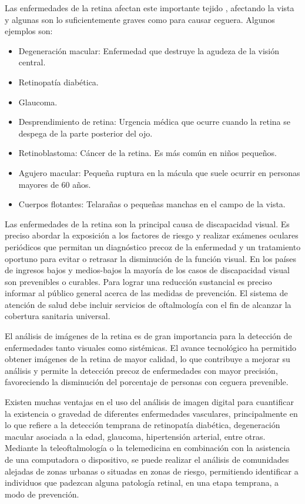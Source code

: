 Las enfermedades de la retina afectan este importante tejido \cite{nih:enfermedadesRetina}, afectando la vista y algunas son lo suficientemente graves como para causar ceguera. Algunos ejemplos son:
\begin{itemize}
\item Degeneraci\'on macular: Enfermedad que destruye la agudeza de la visi\'on central.
\item Retinopat\'ia diab\'etica.
\item Glaucoma.
\item Desprendimiento de retina: Urgencia m\'edica que ocurre cuando la retina se despega de la parte posterior del ojo.
\item Retinoblastoma: C\'ancer de la retina. Es m\'as com\'un en niños pequeños. 
\cite{nih:retinoblastoma}
\item Agujero macular: Pequeña ruptura en la m\'acula que suele ocurrir en personas mayores de 60 años.
\item Cuerpos flotantes: Telarañas o pequeñas manchas en el campo de la vista.
\end{itemize}
Las enfermedades de la retina son la principal causa de discapacidad visual. Es preciso abordar la exposici\'on a los factores de riesgo y realizar ex\'amenes oculares peri\'odicos que permitan un diagn\'ostico precoz de la enfermedad y un tratamiento oportuno para evitar o retrasar la  disminuci\'on de la funci\'on visual. En los pa\'ises de ingresos bajos y medios-bajos la mayor\'ia de los casos de discapacidad visual son prevenibles o curables. Para lograr una reducci\'on sustancial es preciso informar al p\'ublico general acerca de las medidas de prevenci\'on. El sistema de atenci\'on de salud debe incluir servicios de oftalmolog\'ia con el fin de alcanzar la cobertura sanitaria universal. \cite{oms:discapcidadVisual}

El an\'alisis de im\'agenes de la retina es de gran importancia para la detecci\'on de enfermedades tanto visuales como sist\'emicas.
El avance tecnol\'ogico ha permitido obtener im\'agenes de la retina de mayor calidad, lo que contribuye a mejorar su an\'alisis y permite la detecci\'on precoz de enfermedades con mayor precisi\'on, favoreciendo la disminuci\'on del porcentaje de personas con ceguera prevenible. \cite{cunha2012imaging}

Existen muchas ventajas en el uso del an\'alisis de imagen digital para cuantificar la existencia o gravedad de diferentes enfermedades vasculares, principalmente en lo que refiere a la detecci\'on temprana de retinopat\'ia diab\'etica, degeneraci\'on macular asociada a la edad,  glaucoma, hipertensi\'on arterial, entre otras.
Mediante la teleoftalmolog\'ia o la telemedicina en combinaci\'on con la asistencia de una computadora o dispositivo, se puede realizar el an\'alisis de comunidades alejadas de zonas urbanas o situadas en zonas de riesgo, permitiendo identificar a individuos que padezcan alguna patolog\'ia retinal, en una etapa temprana, a modo de prevenci\'on. \cite{kanagasingam2014progress}

